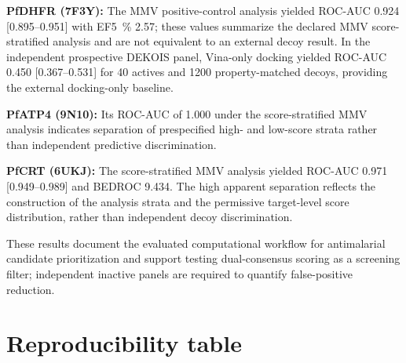\documentclass[journal=jcisd8,manuscript=suppinfo]{achemso}
\begin{document}
\textbf{PfDHFR (7F3Y):} The MMV positive-control analysis yielded ROC-AUC \num{0.924} [\numrange{0.895}{0.951}] with EF\qty{5}{\percent} \num{2.57}; these values summarize the declared MMV score-stratified analysis and are not equivalent to an external decoy result. In the independent prospective DEKOIS panel, Vina-only docking yielded ROC-AUC \num{0.450} [\numrange{0.367}{0.531}] for \num{40} actives and \num{1200} property-matched decoys, providing the external docking-only baseline.

\textbf{PfATP4 (9N10):} Its ROC-AUC of \num{1.000} under the score-stratified MMV analysis indicates separation of prespecified high- and low-score strata rather than independent predictive discrimination.

\textbf{PfCRT (6UKJ):} The score-stratified MMV analysis yielded ROC-AUC \num{0.971} [\numrange{0.949}{0.989}] and BEDROC \num{9.434}. The high apparent separation reflects the construction of the analysis strata and the permissive target-level score distribution, rather than independent decoy discrimination.

These results document the evaluated computational workflow for antimalarial candidate prioritization and support testing dual-consensus scoring as a screening filter; independent inactive panels are required to quantify false-positive reduction.

\section*{Reproducibility table}
\end{document}
